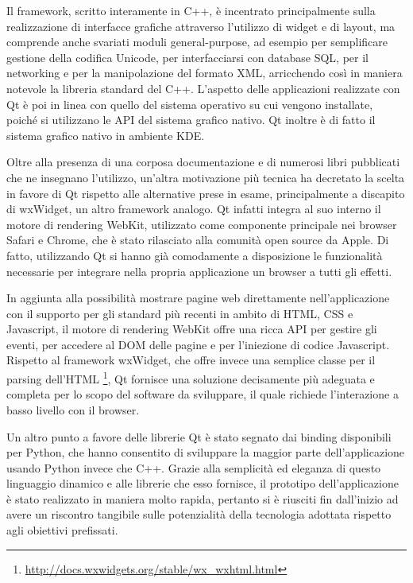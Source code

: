 Il framework, scritto interamente in C++, è incentrato principalmente sulla realizzazione di interfacce grafiche attraverso l'utilizzo di widget e di layout, ma comprende anche svariati moduli general-purpose, ad esempio per semplificare gestione della codifica Unicode, per interfacciarsi con database SQL, per il networking e per la manipolazione del formato XML, arricchendo così in maniera notevole la libreria standard del C++. L'aspetto delle applicazioni realizzate con Qt è poi in linea con quello del sistema operativo su cui vengono installate, poiché si utilizzano le API del sistema grafico nativo. Qt inoltre è di fatto il sistema grafico nativo in ambiente KDE. 

Oltre alla presenza di una corposa documentazione e di numerosi libri pubblicati che ne insegnano l'utilizzo, un'altra motivazione più tecnica ha decretato la scelta in favore di Qt rispetto alle alternative prese in esame, principalmente a discapito di wxWidget, un altro framework analogo. Qt infatti integra al suo interno il motore di rendering WebKit, utilizzato come componente principale nei browser Safari e Chrome, che è stato rilasciato alla comunità open source da Apple. Di fatto, utilizzando Qt si hanno già comodamente a disposizione le funzionalità necessarie per integrare nella propria applicazione un browser a tutti gli effetti. 

In aggiunta alla possibilità mostrare pagine web direttamente nell'applicazione con il supporto per gli standard più recenti in ambito di HTML, CSS e Javascript, il motore di rendering WebKit offre una ricca API per gestire gli eventi, per accedere al DOM delle pagine e per l'iniezione di codice Javascript. Rispetto al framework wxWidget, che offre invece una semplice classe per il parsing dell'HTML \footnote{\url{http://docs.wxwidgets.org/stable/wx_wxhtml.html}}, Qt  fornisce una soluzione decisamente più adeguata e completa per lo scopo del software da sviluppare, il quale richiede l'interazione a basso livello con il browser.

Un altro punto a favore delle librerie Qt è stato segnato dai binding disponibili per Python, che hanno consentito di sviluppare la maggior parte dell'applicazione usando Python invece che C++. Grazie alla semplicità ed eleganza di questo linguaggio dinamico e alle librerie che esso fornisce, il prototipo dell'applicazione è stato realizzato in maniera molto rapida, pertanto si è riusciti fin dall'inizio ad avere un riscontro tangibile sulle potenzialità della tecnologia adottata rispetto agli obiettivi prefissati.

